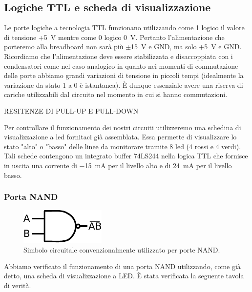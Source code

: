 \subsection{Logiche TTL e scheda di visualizzazione}
Le porte logiche a tecnologia TTL funzionano utilizzando come 1 logico il valore di tensione +\SI{5}{\volt} mentre come 0 logico \SI{0}{\volt}.
Pertanto l'alimentazione che porteremo alla breadboard non sarà più $\pm$\SI{15}{\V} e GND, ma solo $+$\SI{5}{\V} e GND.
Ricordiamo che l'alimentazione deve essere stabilizzata e disaccoppiata con i condensatori come nel caso analogico in quanto nei momenti di commutazione delle porte abbiamo grandi variazioni di tensione in piccoli tempi (idealmente la variazione da stato 1 a 0 è istantanea).
È dunque essenziale avere una riserva di cariche utilizzabili dal circuito nel momento in cui si hanno commutazioni.

RESITENZE DI PULL-UP E PULL-DOWN

Per controllare il funzionamento dei nostri circuiti utilizzeremo una schedina di visualizzazione a led fornitaci già assemblata.
Essa permette di visualizzare lo stato "alto" o "basso" delle linee da monitorare tramite 8 led (4 rossi e 4 verdi).
Tali schede contengono un integrato buffer 74LS244 nella logica TTL che fornisce in uscita una corrente di \SI{-15}{\milli\ampere} per il livello alto e di \SI{24}{\milli\ampere} per il livello basso.

\subsubsection{Porta NAND}

\begin{figure}
\centering
\includegraphics[width=.15\textwidth]{../E09/latex/NAND.pdf}
\caption{Simbolo circuitale convenzionalmente utilizzato per porte NAND.}
\label{cir9:nand}
\end{figure}

Abbiamo verificato il funzionamento di una porta NAND utilizzando, come già detto, una scheda di visualizzazione a LED.
È stata verificata la seguente tavola di verità.\\

